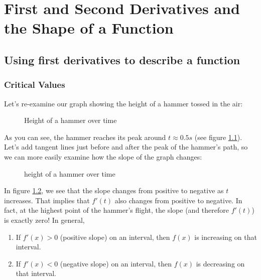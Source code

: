 \chapter{First and Second Derivatives and the Shape of a Function}
\section{Using first derivatives to describe a function}
\subsection{Critical Values}

Let's re-examine our graph showing the height of a hammer tossed in the air:

\begin{figure}
\centering
{}
\caption{Height of a hammer over time}
\label{ref:hammerh}
\end{figure}


As you can see, the hammer reaches its peak around $t \approx 0.5s$ (see 
figure \ref{ref:hammerh}). Let's add tangent lines just before and after the 
peak of the hammer's path, so we can more easily examine how the slope of the 
graph changes:

\begin{figure}
\centering
{}
\caption{height of a hammer over time}
\label{ref:hammerh2}
\end{figure}


In figure \ref{ref:hammerh2}, we see that the slope changes from positive to 
negative as $t$ increases. That implies that $f'(t)$ also changes from positive 
to negative. In fact, at the highest point of the hammer's flight, the slope 
(and therefore $f'(t)$) is exactly zero! In general, 
\begin{enumerate}
	\item If $f'(x)>0$ (positive slope) on an interval, then $f(x)$ is increasing on that 
	interval.
	\item If $f'(x)<0$ (negative slope) on an interval, then $f(x)$ is decreasing on that 
	interval. 
\end{enumerate}


